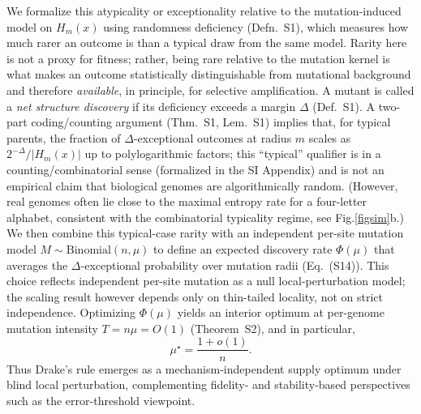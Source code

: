 \documentclass[9pt,twocolumn,oneside]{pnas-new}
\begin{document}
We formalize this atypicality or exceptionality relative to the mutation-induced model on $H_m(x)$ using randomness deficiency (Defn.~S1), which measures how much rarer an outcome is than a typical draw from the same model. Rarity here is not a proxy for fitness; rather, being rare relative to the mutation kernel is what makes an outcome statistically distinguishable from mutational background and therefore \emph{available}, in principle, for selective amplification. A mutant is called a \emph{net structure discovery} if its deficiency exceeds a margin $\Delta$ (Def.~S1). A two-part coding/counting argument (Thm.~S1, Lem.~S1) implies that, for typical parents, the fraction of $\Delta$-exceptional outcomes at radius $m$ scales as $2^{-\Delta}/|H_m(x)|$ up to polylogarithmic factors; this ``typical'' qualifier is in a counting/combinatorial sense (formalized in the SI Appendix) and is not an empirical claim that biological genomes are algorithmically random. (However, real genomes often lie close to the maximal entropy rate for a four-letter alphabet, consistent with the combinatorial typicality regime, see Fig.\ref{figsim}b.) We then combine this typical-case rarity with an independent per-site mutation model $M\sim\mathrm{Binomial}(n,\mu)$ to define an expected discovery rate $\Phi(\mu)$ that averages the $\Delta$-exceptional probability over mutation radii (Eq.~(S14)). This choice reflects independent per-site mutation as a null local-perturbation model; the scaling result however depends only on thin-tailed locality, not on strict independence. Optimizing $\Phi(\mu)$ yields an interior optimum at per-genome mutation intensity $T=n\mu=O(1)$ (Theorem~S2), and in particular,
\[
\mu^\star=\frac{1+o(1)}{n}.
\]
Thus Drake’s rule emerges as a mechanism-independent supply optimum under blind local perturbation, complementing fidelity- and stability-based perspectives such as the error-threshold viewpoint.
\end{document}
